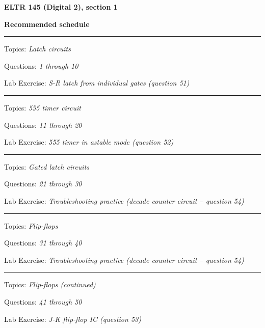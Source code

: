 





\vfil \eject

\centerline{\bf ELTR 145 (Digital 2), section 1} \bigskip 
 
\vskip 10pt

\noindent
{\bf Recommended schedule}

\vskip 5pt

\hrule \vskip 5pt
\noindent
{}

\hskip 10pt Topics: {\it Latch circuits}
 
\hskip 10pt Questions: {\it 1 through 10}
 
\hskip 10pt Lab Exercise: {\it S-R latch from individual gates (question 51)}
 

\vskip 10pt
\hrule \vskip 5pt
\noindent
{}

\hskip 10pt Topics: {\it 555 timer circuit}
 
\hskip 10pt Questions: {\it 11 through 20}
 
\hskip 10pt Lab Exercise: {\it 555 timer in astable mode (question 52)}
 
\vskip 10pt
\hrule \vskip 5pt
\noindent
{}

\hskip 10pt Topics: {\it Gated latch circuits}
 
\hskip 10pt Questions: {\it 21 through 30}
 
\hskip 10pt Lab Exercise: {\it Troubleshooting practice (decade counter circuit -- question 54)}
 
\vskip 10pt
\hrule \vskip 5pt
\noindent
{}

\hskip 10pt Topics: {\it Flip-flops}
 
\hskip 10pt Questions: {\it 31 through 40}
 
\hskip 10pt Lab Exercise: {\it Troubleshooting practice (decade counter circuit -- question 54)}
 
\vskip 10pt
\hrule \vskip 5pt
\noindent
{}

\hskip 10pt Topics: {\it Flip-flops (continued)}
 
\hskip 10pt Questions: {\it 41 through 50}
 
\hskip 10pt Lab Exercise: {\it J-K flip-flop IC (question 53)}
 
